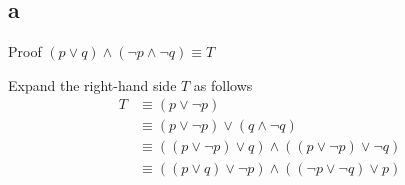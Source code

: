 \subsection{a}
Proof \((p \lor q) \land (\neg p \land \neg q) \equiv T\)

Expand the right-hand side \(T
\) as follows
\begin{equation}
\label{eq:1}
\begin{split}
  T & \equiv (p \lor \neg p) \\
    & \equiv (p \lor \neg p) \lor (q \land \neg q) \\
    & \equiv ((p \lor \neg p) \lor q) \land ((p \lor \neg p) \lor \neg q) \\
    & \equiv ((p \lor q) \lor \neg p) \land ((\neg p \lor \neg q) \lor p)
\end{split}
\end{equation}
